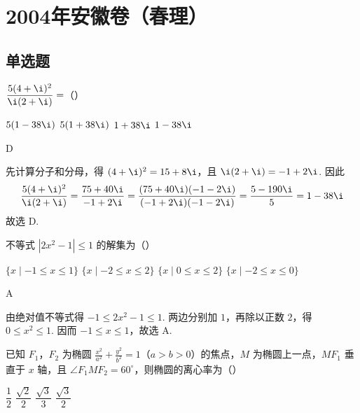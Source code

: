 \chapter{2004年安徽卷（春理）}

\section{单选题}

\begin{problem}
\(\displaystyle\frac{5(4+\i)^2}{\i(2+\i)}=\)（\quad）

\choices
    {\(5(1-38\i)\)}
    {\(5(1+38\i)\)}
    {\(1+38\i\)}
    {\(1-38\i\)}
\end{problem}

\begin{answer}
D
\end{answer}

\begin{solution}
先计算分子和分母，得 \((4+\i)^2=15+8\i\)，且 \(\i(2+\i)=-1+2\i\). 因此
\[
\frac{5(4+\i)^2}{\i(2+\i)}
=\frac{75+40\i}{-1+2\i}
=\frac{(75+40\i)(-1-2\i)}{(-1+2\i)(-1-2\i)}
=\frac{5-190\i}{5}=1-38\i
\]
故选 D.
\end{solution}

\begin{problem}
不等式 \(\left|2x^2-1\right|\leqslant1\) 的解集为（\quad）

\choices
    {\(\{x\mid-1\leqslant x\leqslant1\}\)}
    {\(\{x\mid-2\leqslant x\leqslant2\}\)}
    {\(\{x\mid0\leqslant x\leqslant2\}\)}
    {\(\{x\mid-2\leqslant x\leqslant0\}\)}
\end{problem}

\begin{answer}
A
\end{answer}

\begin{solution}
由绝对值不等式得 \(-1\leqslant2x^2-1\leqslant1\). 两边分别加 \(1\)，再除以正数 \(2\)，得 \(0\leqslant x^2\leqslant1\). 因而 \(-1\leqslant x\leqslant1\)，故选 A.
\end{solution}

\begin{problem}
已知 \(F_1\)，\(F_2\) 为椭圆 \(\displaystyle\frac{x^2}{a^2}+\frac{y^2}{b^2}=1\)（\(a>b>0\)）的焦点，\(M\) 为椭圆上一点，\(MF_1\) 垂直于 \(x\) 轴，且 \(\angle F_1MF_2=60^\circ\)，则椭圆的离心率为（\quad）

\choices
    {\(\dfrac12\)}
    {\(\dfrac{\sqrt2}{2}\)}
    {\(\dfrac{\sqrt3}{3}\)}
    {\(\dfrac{\sqrt3}{2}\)}
\end{problem}

